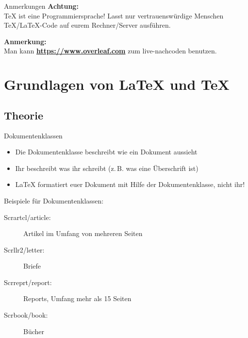 \documentclass{beamer}
\newcommand{\slideheading}[1]{\textbf{#1}\\}
\begin{document}
		
		\begin{frame}{Anmerkungen}
			\slideheading{Achtung:} \TeX{} ist eine Programmiersprache! Lasst nur vertrauenswürdige
			Menschen \TeX/\LaTeX-Code auf eurem Rechner/Server ausführen.
			
			\vspace{0.2cm}
			\slideheading{Anmerkung:} Man kann \textbf{\href{https://www.overleaf.com}{https://www.overleaf.com}} zum live-nachcoden benutzen.
		\end{frame}
		
		
		\section{Grundlagen von \LaTeX{} und \TeX}
		\subsection{Theorie}
		
		\begin{frame}{Dokumentenklassen}
			\begin{itemize}
				\item Die Dokumentenklasse beschreibt wie ein Dokument aussieht
				\item Ihr beschreibt was ihr schreibt (z.\,B. was eine Überschrift ist)
				\item \LaTeX{} formatiert euer Dokument mit Hilfe der Dokumentenklasse, nicht ihr!
			\end{itemize}
			\vspace{0.2cm}
			Beispiele für Dokumentenklassen:
			\begin{description}
				\item[Scrartcl/article:] Artikel im Umfang von mehreren Seiten
				\item[Scrllr2/letter:] Briefe
				\item[Scrreprt/report:] Reports, Umfang mehr als 15 Seiten
				\item[Scrbook/book:] Bücher
			\end{description}
		\end{frame}
		
		
\end{document}
